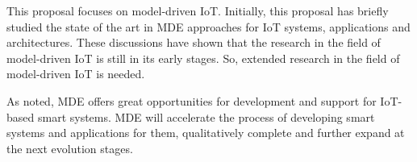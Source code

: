 This proposal focuses on model-driven IoT. Initially, this proposal has briefly studied the state of the art in MDE approaches for IoT systems, applications and architectures. These discussions have shown that the research in the field of model-driven IoT is still in its early stages. So, extended research in the field of model-driven IoT is needed. 

As noted, MDE offers great opportunities for development and support for IoT-based smart systems. MDE will accelerate the process of developing smart systems and applications for them, qualitatively complete and further expand at the next evolution stages.
